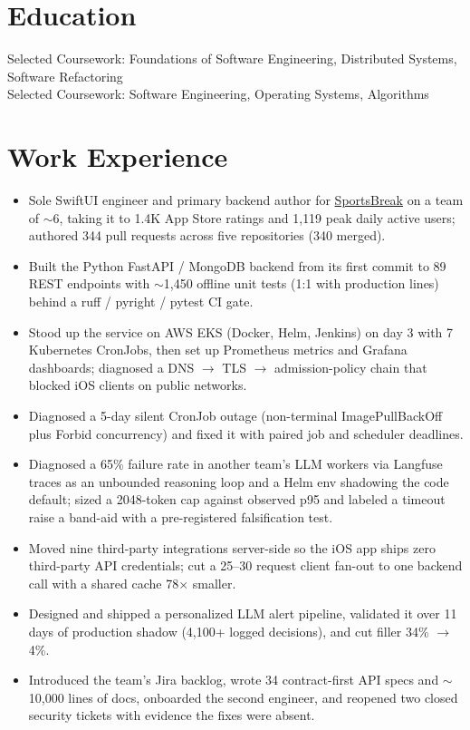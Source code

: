 \documentclass[11pt, letterpaper]{article}
\begin{document}

\section{Education}
Selected Coursework: Foundations of Software Engineering, Distributed Systems, Software Refactoring\\[1pt]
Selected Coursework: Software Engineering, Operating Systems, Algorithms

\section{Work Experience}
\begin{itemize}
  \item Sole SwiftUI engineer and primary backend author for \href{https://apps.apple.com/app/id6762649287}{SportsBreak} on a team of $\sim$6, taking it to 1.4K App Store ratings and 1{,}119 peak daily active users; authored 344 pull requests across five repositories (340 merged).
  \item Built the Python FastAPI / MongoDB backend from its first commit to 89 REST endpoints with $\sim$1{,}450 offline unit tests (1:1 with production lines) behind a ruff / pyright / pytest CI gate.
  \item Stood up the service on AWS EKS (Docker, Helm, Jenkins) on day 3 with 7 Kubernetes CronJobs, then set up Prometheus metrics and Grafana dashboards; diagnosed a DNS $\to$ TLS $\to$ admission-policy chain that blocked iOS clients on public networks.
  \item Diagnosed a 5-day silent CronJob outage (non-terminal ImagePullBackOff plus Forbid concurrency) and fixed it with paired job and scheduler deadlines.
  \item Diagnosed a 65\% failure rate in another team's LLM workers via Langfuse traces as an unbounded reasoning loop and a Helm env shadowing the code default; sized a 2048-token cap against observed p95 and labeled a timeout raise a band-aid with a pre-registered falsification test.
  \item Moved nine third-party integrations server-side so the iOS app ships zero third-party API credentials; cut a 25--30 request client fan-out to one backend call with a shared cache 78$\times$ smaller.
  \item Designed and shipped a personalized LLM alert pipeline, validated it over 11 days of production shadow (4{,}100+ logged decisions), and cut filler 34\% $\to$ 4\%.
  \item Introduced the team's Jira backlog, wrote 34 contract-first API specs and $\sim$10{,}000 lines of docs, onboarded the second engineer, and reopened two closed security tickets with evidence the fixes were absent.
\end{itemize}
\end{document}
